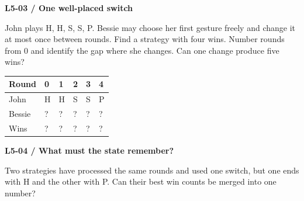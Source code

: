 \documentclass[11pt,a4paper]{article}
\begin{document}
\par\noindent\begin{minipage}{\linewidth}
\textbf{L5-03 / One well-placed switch}\par\smallskip John plays H, H, S, S, P. Bessie may choose her first gesture freely and change it at most once between rounds. Find a strategy with four wins. Number rounds from 0 and identify the gap where she changes. Can one change produce five wins?\par
\par\medskip \begingroup\small\setlength{\tabcolsep}{4pt}\renewcommand{\arraystretch}{1.35}\begin{tabularx}{\linewidth}{>{\raggedright\arraybackslash}X>{\raggedright\arraybackslash}X>{\raggedright\arraybackslash}X>{\raggedright\arraybackslash}X>{\raggedright\arraybackslash}X>{\raggedright\arraybackslash}X}\toprule\textbf{Round} & \textbf{0} & \textbf{1} & \textbf{2} & \textbf{3} & \textbf{4}\\\midrule
John & H & H & S & S & P\\
Bessie & ? & ? & ? & ? & ?\\
Wins & ? & ? & ? & ? & ?\\
\bottomrule\end{tabularx}\endgroup\par\medskip 
\end{minipage}\par\vspace{4mm}
\par\noindent\begin{minipage}{\linewidth}
\textbf{L5-04 / What must the state remember?}\par\smallskip Two strategies have processed the same rounds and used one switch, but one ends with H and the other with P. Can their best win counts be merged into one number?\par
\end{minipage}\par\vspace{4mm}
\end{document}
